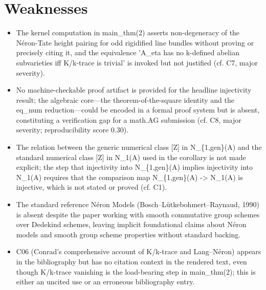 \documentclass[11pt]{article}
\begin{document}
\section*{Weaknesses}
\begin{itemize}[leftmargin=*]
  \item The kernel computation in main\_thm(2) asserts non-degeneracy of the Néron-Tate height pairing for odd rigidified line bundles without proving or precisely citing it, and the equivalence 'A\_eta has no k-defined abelian subvarieties iff K/k-trace is trivial' is invoked but not justified (cf. C7, major severity).
  \item No machine-checkable proof artifact is provided for the headline injectivity result; the algebraic core---the theorem-of-the-square identity and the eq\_num reduction---could be encoded in a formal proof system but is absent, constituting a verification gap for a math.AG submission (cf. C8, major severity; reproducibility score 0.30).
  \item The relation between the generic numerical class [Z] in N\_\{1,gen\}(A) and the standard numerical class [Z] in N\_1(A) used in the corollary is not made explicit; the step that injectivity into N\_\{1,gen\}(A) implies injectivity into N\_1(A) requires that the comparison map N\_\{1,gen\}(A) -> N\_1(A) is injective, which is not stated or proved (cf. C1).
  \item The standard reference Néron Models (Bosch--Lütkebohmert--Raynaud, 1990) is absent despite the paper working with smooth commutative group schemes over Dedekind schemes, leaving implicit foundational claims about Néron models and smooth group scheme properties without standard backing.
  \item C06 (Conrad's comprehensive account of K/k-trace and Lang--Néron) appears in the bibliography but has no citation context in the rendered text, even though K/k-trace vanishing is the load-bearing step in main\_thm(2); this is either an uncited use or an erroneous bibliography entry.
\end{itemize}
\end{document}
